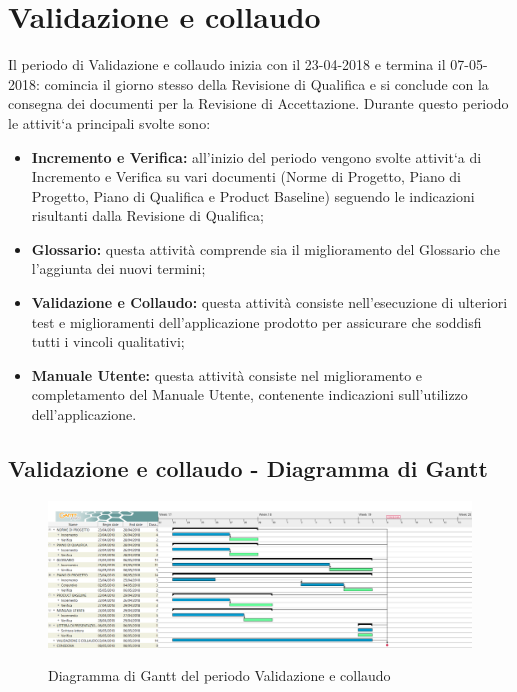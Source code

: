 \documentclass[PianoDiProgetto.tex]{subfiles}
\begin{document}
\section{Validazione e collaudo}
Il periodo di Validazione e collaudo inizia con il 23-04-2018 e termina il
07-05-2018: comincia il giorno stesso della Revisione di Qualifica e si conclude
con la consegna dei documenti per la Revisione di Accettazione. Durante
questo periodo le attivit`a principali svolte sono:
\begin{itemize}
\item \textbf{Incremento e Verifica:} all’inizio del periodo vengono svolte attivit`a
di Incremento e Verifica su vari documenti (Norme di Progetto, Piano
di Progetto, Piano di Qualifica e Product Baseline) seguendo le indicazioni risultanti dalla Revisione di Qualifica;
\item \textbf{Glossario:} questa attività comprende sia il miglioramento del
Glossario che l’aggiunta dei nuovi termini;
\item \textbf{Validazione e Collaudo:} questa attività consiste nell’esecuzione di
ulteriori test e miglioramenti dell'applicazione prodotto per assicurare che
soddisfi tutti i vincoli qualitativi;
\item  \textbf{Manuale Utente:} questa attività consiste nel miglioramento e
completamento del Manuale Utente, contenente indicazioni sull’utilizzo
dell'applicazione.
\end{itemize}
\begin{landscape}
\subsection{Validazione e collaudo - Diagramma di Gantt}
\begin{figure}[ht]
	\includegraphics[width=21cm]{images/gantt/collaudo.png}
	\label{fig:foo}
	\caption{Diagramma di Gantt del periodo Validazione e collaudo}
\end{figure}
\end{landscape}	
\end{document}
